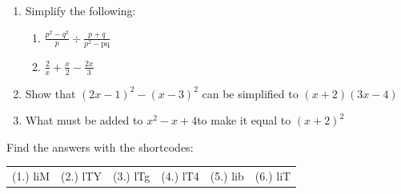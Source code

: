 \begin{enumerate}[noitemsep, label=\textbf{\arabic*}. ]
\item Simplify the following:
\label{m39392*eip-id1153}\begin{enumerate}[noitemsep, label=\textbf{\alph*}. ] 
            \item $\frac{{p}^{2}-{q}^{2}}{p}÷\frac{p+q}{{p}^{2}-\mathrm{pq}}$\item $\frac{2}{x}+\frac{x}{2}-\frac{2x}{3}$\end{enumerate}
\label{m39392*uid56}\item Show that ${\left(2x-1\right)}^{2}-{\left(x-3\right)}^{2}$ can be simplified to $\left(x+2\right)\left(3x-4\right)$
\newline
\newline
\label{m39392*uid57}\item What must be added to ${x}^{2}-x+4$\hspace{1ex}to make it equal to ${\left(x+2\right)}^{2}$
\newline
\newline
\end{enumerate}
  \label{m39392**end}
  \label{d4e6ddcad4e2d9e383c4732da6858c66**end}
\par {} Find the answers with the shortcodes:
 \par \begin{tabular}[h]{cccccc}
 (1.) liM  &  (2.) lTY  &  (3.) lTg  &  (4.) lT4  &  (5.) lib  &  (6.) liT  & \end{tabular}
